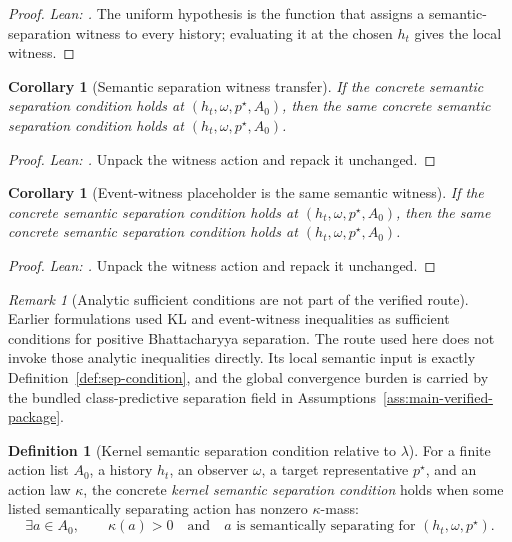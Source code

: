 \documentclass[11pt]{article}
\newtheorem{corollary}[theorem]{Corollary}
\theoremstyle{definition}
\newtheorem{definition}[theorem]{Definition}
\theoremstyle{remark}
\newtheorem{remark}[theorem]{Remark}
\theoremstyle{plain}
\theoremstyle{definition}
\begin{document}
\begin{proof}
\noindent\emph{Lean: .}
The uniform hypothesis is the function that assigns a semantic-separation witness to every history; evaluating it at the chosen $h_t$ gives the local witness.
\end{proof}

\begin{corollary}[Semantic separation witness transfer]
\label{cor:kl-implies-semantic-separation}
If the concrete semantic separation condition holds at $(h_t,\omega,p^\star,A_0)$, then the same concrete semantic separation condition holds at $(h_t,\omega,p^\star,A_0)$.
\end{corollary}

\begin{proof}
\noindent\emph{Lean: .}
Unpack the witness action and repack it unchanged.
\end{proof}

\begin{corollary}[Event-witness placeholder is the same semantic witness]
\label{cor:event-witness-implies-semantic-separation}
If the concrete semantic separation condition holds at $(h_t,\omega,p^\star,A_0)$, then the same concrete semantic separation condition holds at $(h_t,\omega,p^\star,A_0)$.
\end{corollary}

\begin{proof}
\noindent\emph{Lean: .}
Unpack the witness action and repack it unchanged.
\end{proof}

\begin{remark}[Analytic sufficient conditions are not part of the verified route]
\label{rem:no-pairwise-bhat-corollary}
Earlier formulations used KL and event-witness inequalities as sufficient conditions for positive Bhattacharyya separation. The route used here does not invoke those analytic inequalities directly. Its local semantic input is exactly Definition~\ref{def:sep-condition}, and the global convergence burden is carried by the bundled class-predictive separation field in Assumptions~\ref{ass:main-verified-package}.
\end{remark}

\begin{definition}[Kernel semantic separation condition relative to $\lambda$]
\label{def:kernel-sep-condition}
For a finite action list $A_0$, a history $h_t$, an observer $\omega$, a target representative $p^\star$, and an action law $\kappa$, the concrete \emph{kernel semantic separation condition} holds when some listed semantically separating action has nonzero $\kappa$-mass:
\[
\exists a\in A_0,\qquad \kappa(a)>0
\quad\text{and}\quad
a\text{ is semantically separating for }(h_t,\omega,p^\star).
\]
\end{definition}
\end{document}
